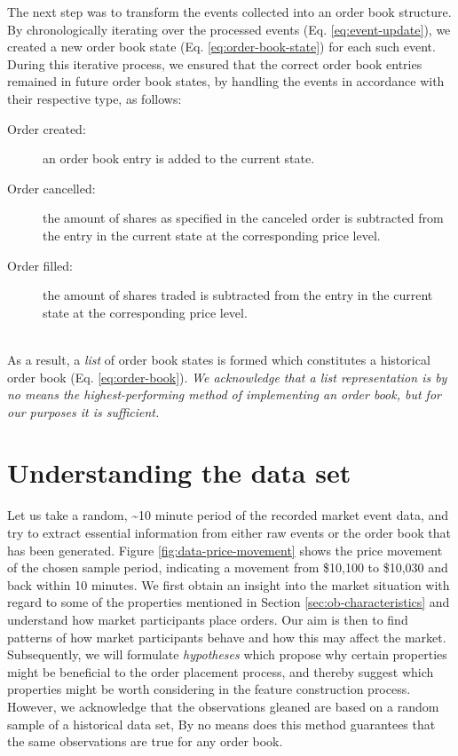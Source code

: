The next step was to transform the events collected into an order book structure.
By chronologically iterating over the processed events (Eq. \ref{eq:event-update}), we created a new order book state (Eq. \ref{eq:order-book-state}) for each such event.
During this iterative process, we ensured that the correct order book entries remained in future order book states, by handling the events in accordance with their respective type, as follows:
\begin{description}
    \item[Order created:] an order book entry is added to the current state.
    \item[Order cancelled:] the amount of shares as specified in the canceled order is subtracted from the entry in the current state at the corresponding price level.
    \item[Order filled:] the amount of shares traded is subtracted from the entry in the current state at the corresponding price level.
\end{description}
\hfill
\\
As a result, a \textit{list} of order book states is formed which constitutes a historical order book (Eq. \ref{eq:order-book}).
\textit{We acknowledge that a list representation is by no means the highest-performing method of implementing an order book, but for our purposes it is sufficient.}

\vfill

\section{Understanding the data set}
\label{sec:data-hypotheses}

Let us  take a random, \textasciitilde10 minute period of the recorded market event data, and try to extract essential information from either raw events or the order book that has been generated.
Figure \ref{fig:data-price-movement} shows the price movement of the chosen sample period, indicating a movement from \$10,100 to \$10,030 and back within 10 minutes.
We first obtain an insight into the market situation with regard to some of the properties mentioned in Section \ref{sec:ob-characteristics} and understand how market participants place orders.
Our aim is then to find patterns of how market participants behave and how this may affect the market.
Subsequently, we will formulate \textit{hypotheses} which propose why certain properties might be beneficial to the order placement process, and thereby suggest which properties might be worth considering in the feature construction process. 
However, we acknowledge that the observations gleaned are based on a random sample of a historical data set,
By no means does this method guarantees that the same observations are true for any order book.

